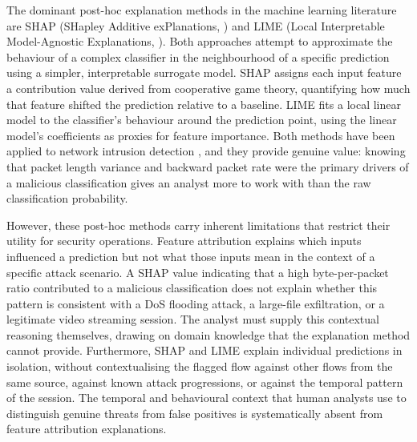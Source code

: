 The dominant post-hoc explanation methods in the machine learning literature are SHAP (SHapley Additive exPlanations, \cite{Lundberg2017}) and LIME (Local Interpretable Model-Agnostic Explanations, \cite{Ribeiro2016}). Both approaches attempt to approximate the behaviour of a complex classifier in the neighbourhood of a specific prediction using a simpler, interpretable surrogate model. SHAP assigns each input feature a contribution value derived from cooperative game theory, quantifying how much that feature shifted the prediction relative to a baseline. LIME fits a local linear model to the classifier's behaviour around the prediction point, using the linear model's coefficients as proxies for feature importance. Both methods have been applied to network intrusion detection \autocite{Marino2018,Vigneswaran2019}, and they provide genuine value: knowing that packet length variance and backward packet rate were the primary drivers of a malicious classification gives an analyst more to work with than the raw classification probability.

However, these post-hoc methods carry inherent limitations that restrict their utility for security operations. Feature attribution explains which inputs influenced a prediction but not what those inputs mean in the context of a specific attack scenario. A SHAP value indicating that a high byte-per-packet ratio contributed to a malicious classification does not explain whether this pattern is consistent with a DoS flooding attack, a large-file exfiltration, or a legitimate video streaming session. The analyst must supply this contextual reasoning themselves, drawing on domain knowledge that the explanation method cannot provide. Furthermore, SHAP and LIME explain individual predictions in isolation, without contextualising the flagged flow against other flows from the same source, against known attack progressions, or against the temporal pattern of the session. The temporal and behavioural context that human analysts use to distinguish genuine threats from false positives is systematically absent from feature attribution explanations.

